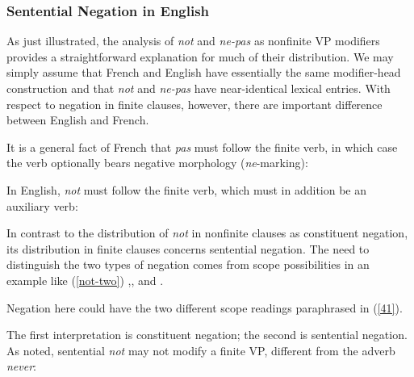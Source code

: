 \documentclass[output=paper]{langsci/langscibook}
\begin{document}
\subsubsection{Sentential Negation in English}


As just
illustrated, the analysis of \emph{not} and \emph{ne-pas} as nonfinite VP modifiers provides a straightforward explanation for much of their distribution. We may simply assume that French and English have essentially the
same modifier-head construction and that {\it not} and {\it ne-pas} have
near-identical lexical entries. With respect to negation in finite clauses,
however, there are important difference between English and French.

It is a general fact of French that \emph{pas} must follow the finite verb, in
which case the verb optionally bears negative morphology ({\it ne}-marking):

\be
\ex \begin{xlist}
\end{xlist}
\ee

\noindent
In English, {\it not} must follow the finite verb, which
must in addition be an auxiliary verb:

\be
\ex \begin{xlist}
\end{xlist}
\ee

In contrast to the distribution of {\it not}
 in nonfinite clauses as constituent negation, its distribution
 in finite clauses concerns sentential
 negation.
 The need to distinguish the two types of negation comes from scope
possibilities in an example like (\ref{not-two}) \citep{Klima:64},\citep{Baker:89}, and \citep{Warner:00}.

\be
{}
\ee
%
Negation here could have the two different scope readings
paraphrased in (\ref{41}).


\be
\ex \label{41}\begin{xlist}
\end{xlist}
\ee
%
The first interpretation is constituent negation; the second is
sentential negation. As noted, sentential \emph{not} may not modify a finite
VP, different from the adverb {\it never}:
\end{document}
